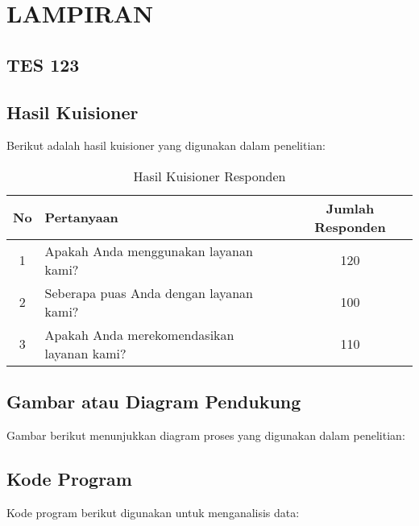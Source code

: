 \chapter{LAMPIRAN}
\label{chap:lampiran}

\section*{TES 123}
\label{sec:tes-lampiran}


\section*{Hasil Kuisioner}
Berikut adalah hasil kuisioner yang digunakan dalam penelitian:

\begin{table}[htbp]
    \centering
    \begin{tabular}{|c|l|c|}
        \hline
        No & Pertanyaan & Jumlah Responden \\
        \hline
        1  & Apakah Anda menggunakan layanan kami? & 120 \\
        2  & Seberapa puas Anda dengan layanan kami? & 100 \\
        3  & Apakah Anda merekomendasikan layanan kami? & 110 \\
        \hline
    \end{tabular}
    \caption{Hasil Kuisioner Responden}
    \label{tab:kuisioner}
\end{table}

\section*{Gambar atau Diagram Pendukung}
Gambar berikut menunjukkan diagram proses yang digunakan dalam penelitian:


\section*{Kode Program}
Kode program berikut digunakan untuk menganalisis data:

